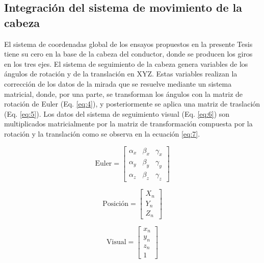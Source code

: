 \newpage
\subsection{Integración del sistema de movimiento de la cabeza }\label{432}

El sistema de coordenadas global de los ensayos propuestos en la presente Tesis tiene su cero en la base de la cabeza del conductor, donde se producen los giros en los tres ejes. El sistema de seguimiento de la cabeza genera variables de los ángulos de rotación y de la translación en XYZ. Estas variables realizan la corrección de los datos de la mirada que se resuelve mediante un sistema matricial, donde, por una parte, se transforman los ángulos con la matriz de rotación de Euler (Eq. \ref{eq:4}), y posteriormente se aplica una matriz de traslación (Eq. \ref{eq:5}). Los datos del sistema de seguimiento visual (Eq. \ref{eq:6}) son multiplicados matricialmente por la matriz de transformación compuesta por la rotación y la translación como se observa en la ecuación \ref{eq:7}.


\begin{equation}\label{eq:4}
\text{Euler} = \begin{bmatrix}
\alpha_x & \beta_x & \gamma_x \\
\alpha_y & \beta_y & \gamma_y \\
\alpha_z & \beta_z & \gamma_z
\end{bmatrix}
\end{equation}

\begin{equation}\label{eq:5}
\text{Posición} = \begin{bmatrix}
X_n \\
Y_n \\
Z_n
\end{bmatrix}
\end{equation}

\begin{equation}
\text{Visual} = \begin{bmatrix} \label{eq:6}
x_n \\
y_n \\
z_n \\
1
\end{bmatrix}
\end{equation}

